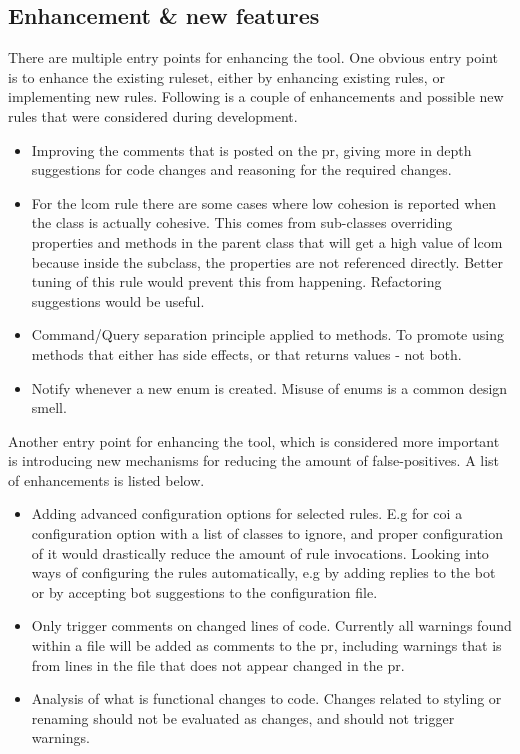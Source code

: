 \documentclass{report}
\begin{document}
\label{futurework}


\subsection{Enhancement \& new features}
There are multiple entry points for enhancing the tool. One obvious entry point is to enhance the existing ruleset, either by enhancing existing rules, or implementing new rules. Following is a couple of enhancements and possible new rules that were considered during development.


\begin{itemize}
    \item Improving the comments that is posted on the \gls{pr}, giving more in depth suggestions for code changes and reasoning for the required changes.  

    \item For the \gls{lcom} rule there are some cases where low cohesion is reported when the class is actually cohesive. This comes from sub-classes overriding properties and methods in the parent class that will get a high value of \gls{lcom} because inside the subclass, the properties are not referenced directly. Better tuning of this rule would prevent this from happening. Refactoring suggestions would be useful.
    
    \item Command/Query separation principle applied to methods. To promote using methods that either has side effects, or that returns values - not both. 
    
    \item Notify whenever a new enum is created. Misuse of enums is a common design smell.
\end{itemize}


Another entry point for enhancing the tool, which is considered more important is introducing new mechanisms for reducing the amount of false-positives. A list of enhancements is listed below.

\begin{itemize}
    \item Adding advanced configuration options for selected rules. E.g for \gls{coi} a configuration option with a list of classes to ignore, and proper configuration of it would drastically reduce the amount of rule invocations. Looking into ways of configuring the rules automatically, e.g by adding replies to the bot or by accepting bot suggestions to the configuration file.
    
    \item Only trigger comments on changed lines of code. Currently all warnings found within a file will be added as comments to the \gls{pr}, including warnings that is from lines in the file that does not appear changed in the \gls{pr}. 
    
    \item Analysis of what is functional changes to code. Changes related to styling or renaming should not be evaluated as changes, and should not trigger warnings.
\end{itemize}
\end{document}
